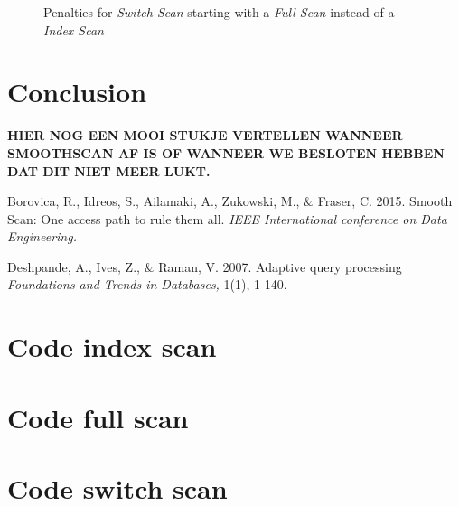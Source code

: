 \documentclass[a4paper,11pt,twoside]{article}
\begin{document}
\begin{figure}[ht!]
\centering
{}
\quad
{}
%	
\caption{Penalties for \textit{Switch Scan} starting with a \textit{Full Scan} instead of a \textit{Index Scan}}
\label{fig:result3}
\end{figure}
\pagebreak

\section{Conclusion}
\textbf{HIER NOG EEN MOOI STUKJE VERTELLEN WANNEER SMOOTHSCAN AF IS OF WANNEER WE BESLOTEN HEBBEN DAT DIT NIET MEER LUKT.}

\begin{thebibliography}{9}

	 Borovica, R., Idreos, S., Ailamaki, A., Zukowski, M., $\&$ Fraser, C.
	2015.	
 	Smooth Scan: One access path to rule them all.
	\emph{IEEE International conference on Data Engineering.}

	Deshpande, A., Ives, Z., $\&$ Raman, V.
	2007.
	Adaptive query processing
	\emph{Foundations and Trends in Databases,}
	1(1), 1-140.
\end{thebibliography}
\newpage

\begin{appendices}
\section{Code index scan}
\label{appendixa}

\section{Code full scan}
\label{appendixb}

\section{Code switch scan}
\label{appendixc}

\end{appendices}
\end{document}
